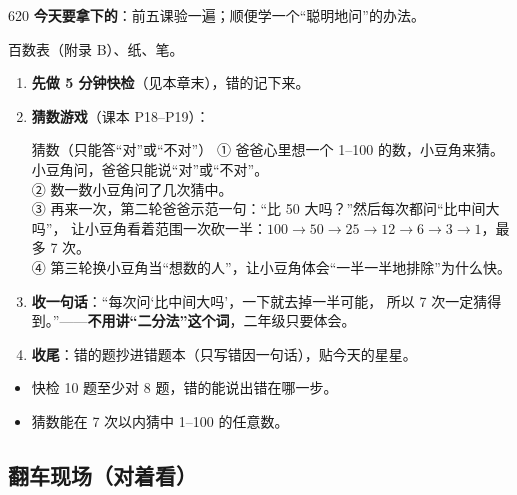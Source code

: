 \begin{lesson}{6}{20}
\textbf{今天要拿下的}：前五课验一遍；顺便学一个“聪明地问”的办法。

\begin{materials}
百数表（附录 B）、纸、笔。
\end{materials}

\begin{enumerate}
  \item \textbf{先做 5 分钟快检}（见本章末），错的记下来。
  \item \textbf{猜数游戏}（课本 P18--P19）：
        \begin{playbox}{猜数（只能答“对”或“不对”）}
        ① 爸爸心里想一个 1--100 的数，小豆角来猜。小豆角问，爸爸只能说“对”或“不对”。\\
        ② 数一数小豆角问了几次猜中。\\
        ③ 再来一次，第二轮爸爸示范一句：“比 50 大吗？”然后每次都问“比中间大吗”，
        让小豆角看着范围一次砍一半：$100\to50\to25\to12\to6\to3\to1$，最多 7 次。\\
        ④ 第三轮换小豆角当“想数的人”，让小豆角体会“一半一半地排除”为什么快。
        \end{playbox}
  \item \textbf{收一句话}：“每次问‘比中间大吗’，一下就去掉一半可能，
        所以 7 次一定猜得到。”——\textbf{不用讲“二分法”这个词}，二年级只要体会。
  \item \textbf{收尾}：错的题抄进错题本（只写错因一句话），贴今天的星星。
\end{enumerate}

\begin{passbox}
\begin{itemize}
  \item 快检 10 题至少对 8 题，错的能说出错在哪一步。
  \item 猜数能在 7 次以内猜中 1--100 的任意数。
\end{itemize}
\end{passbox}
\end{lesson}

\subsection{翻车现场（对着看）}

